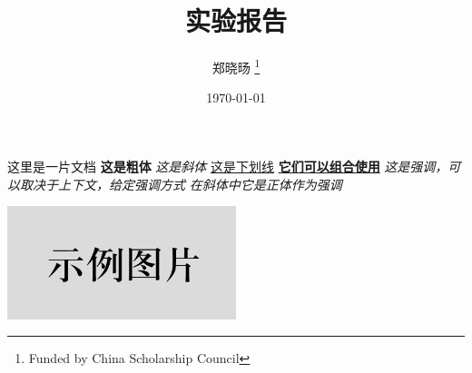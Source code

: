 \documentclass{article}
\title{实验报告}
\author{郑晓旸
    \thanks{Funded by China Scholarship Council}
    }
\date{\today}
\begin{document}
\maketitle
这里是一片文档\newline
\textbf{这是粗体}
\newline
\textit{这是斜体}
\newline
\underline{这是下划线}
\newline
\underline{\textbf{它们可以组合使用}}
\newline
\emph{这是强调，可以取决于上下文，给定强调方式}
\newline
\textit{在斜体中\emph{它是正体}作为强调}
\newline
\begin{center}
    \includegraphics[width=0.5\textwidth]{image/example.png}    
\end{center}


\end{document}

